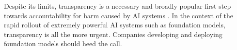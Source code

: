 Despite its limits, transparency is a necessary and broadly popular first step towards accountability for harm caused by AI systems \citep{kaminski_2020, bates2023socially}. In the context of the rapid rollout of extremely powerful AI systems such as foundation models, transparency is all the more urgent. Companies developing and deploying foundation models should heed the call.
